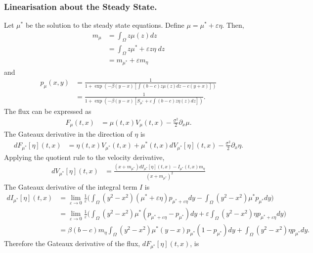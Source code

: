 \documentclass[10pt]{article}
\begin{document}
\subsubsection*{Linearisation about the Steady State.}
    
Let $\mu^*$ be the solution to the steady state equations. Define $\mu = \mu^* + \varepsilon \eta$. Then,
\begin{align*}
    m_\mu &= \int_{\Omega} z \mu(z) dz\\
    &= \int_{\Omega} z \mu^* + \varepsilon z \eta \;dz\\
    &= m_{\mu^*}  + \varepsilon m_\eta
\end{align*}
and 
\begin{align*}
    p_\mu(x,y) &= \frac{1}{1+\exp(-\beta(y-x)[\int(b-c)z\mu(z)dz-c(y+x)])}\\
    &= \frac{1}{1+\exp(-\beta(y-x)[S_{\mu^*} +\varepsilon\int(b-c)z\eta(z)dz])}.
\end{align*}
The flux can be expressed as
\begin{align*}
    F_\mu(t,x) &= \mu(t,x)V_\mu(t,x)- \frac{\sigma^2}{2}\partial_x\mu.
\end{align*}
The Gateaux derivative in the direction of $\eta$ is 
\begin{align*}
     dF_{\mu^*}[\eta](t,x) &= \eta(t,x) V_{\mu^*}(t,x) +{\mu^*}(t,x)dV_{\mu^*}[\eta](t,x)  - \frac{\sigma^2}{2}\partial_x\eta.
\end{align*}
Applying the quotient rule to the velocity derivative, 
\begin{align*}
    dV_{\mu^*}[\eta](t,x) &= \frac{(x+m_{\mu^*})dI_{\mu^*}[\eta](t,x) - I_{\mu^*}(t,x)m_\eta}{(x+m_{\mu^*})^2} 
\end{align*}
The Gateaux derivative of the integral term $I$ is
\begin{align*}
    dI_{\mu^*}[\eta](t,x) &= \lim_{\varepsilon\rightarrow0}\frac{1}{\varepsilon}\Big(\int_\Omega(y^2-x^2)(\mu^*+\varepsilon\eta)p_{\mu^*+\varepsilon\eta} dy - \int_\Omega(y^2-x^2)\mu^*p_{\mu^*} dy\Big)\\
    &= \lim_{\varepsilon\rightarrow0}\frac{1}{\varepsilon}\Big(\int_\Omega(y^2-x^2)\mu^*(p_{\mu^*+\varepsilon\eta}-p_{\mu^*})dy + \varepsilon \int_\Omega(y^2-x^2)\eta p_{\mu^*+\varepsilon\eta} dy\Big)\\
    &=\beta(b-c)m_\eta\int_\Omega(y^2-x^2)\mu^*(y-x)p_{\mu^*}(1-p_{\mu^*})dy + \int_\Omega(y^2-x^2)\eta p_{\mu^*} dy.
\end{align*}
Therefore the Gateaux derivative of the flux, $dF_{\mu^*}[\eta](t,x)$, is
\end{document}
